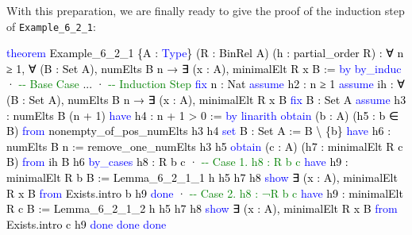 \documentclass[
  letterpaper,
  DIV=11,
  numbers=noendperiod]{scrreprt}
\newenvironment{Shaded}{\begin{snugshade}}{\end{snugshade}}
\newcommand{\CommentTok}[1]{\textcolor[rgb]{0.37,0.37,0.37}{#1}}
\newcommand{\KeywordTok}[1]{\textcolor[rgb]{0.00,0.23,0.31}{#1}}
\newcommand{\NormalTok}[1]{\textcolor[rgb]{0.00,0.23,0.31}{#1}}
\renewcommand{\NormalTok}[1]{\textcolor[HTML]{000000}{#1}}
\renewcommand{\KeywordTok}[1]{\textcolor[HTML]{0000FF}{#1}}
\renewcommand{\CommentTok}[1]{\textcolor[HTML]{008000}{#1}}
\theoremstyle{remark}
\begin{document}
With this preparation, we are finally ready to give the proof of the
induction step of \texttt{Example\_6\_2\_1}:

\begin{Shaded}
\begin{Highlighting}[]
\KeywordTok{theorem}\NormalTok{ Example\_6\_2\_1 \{A : }\KeywordTok{Type}\NormalTok{\} (R : BinRel A) (h : partial\_order R) :}
\NormalTok{    ∀ n ≥ 1, ∀ (B : Set A), numElts B n →}
\NormalTok{      ∃ (x : A), minimalElt R x B := }\KeywordTok{by}
  \KeywordTok{by\_induc}
\NormalTok{  · }\CommentTok{{-}{-} Base Case}
\NormalTok{    ...}
\NormalTok{  · }\CommentTok{{-}{-} Induction Step}
    \KeywordTok{fix}\NormalTok{ n : Nat}
    \KeywordTok{assume}\NormalTok{ h2 : n ≥ 1}
    \KeywordTok{assume}\NormalTok{ ih : ∀ (B : Set A), numElts B n → ∃ (x : A), minimalElt R x B}
    \KeywordTok{fix}\NormalTok{ B : Set A}
    \KeywordTok{assume}\NormalTok{ h3 : numElts B (n + 1)}
    \KeywordTok{have}\NormalTok{ h4 : n + 1 \textgreater{} 0 := }\KeywordTok{by} \KeywordTok{linarith}
    \KeywordTok{obtain}\NormalTok{ (b : A) (h5 : b ∈ B) }\KeywordTok{from}\NormalTok{ nonempty\_of\_pos\_numElts h3 h4}
    \KeywordTok{set}\NormalTok{ B\textquotesingle{} : Set A := B \textbackslash{} \{b\}}
    \KeywordTok{have}\NormalTok{ h6 : numElts B\textquotesingle{} n := remove\_one\_numElts h3 h5}
    \KeywordTok{obtain}\NormalTok{ (c : A) (h7 : minimalElt R c B\textquotesingle{}) }\KeywordTok{from}\NormalTok{ ih B\textquotesingle{} h6}
    \KeywordTok{by\_cases}\NormalTok{ h8 : R b c}
\NormalTok{    · }\CommentTok{{-}{-} Case 1. h8 : R b c}
      \KeywordTok{have}\NormalTok{ h9 : minimalElt R b B := Lemma\_6\_2\_1\_1 h h5 h7 h8}
      \KeywordTok{show}\NormalTok{ ∃ (x : A), minimalElt R x B }\KeywordTok{from}\NormalTok{ Exists.intro b h9}
      \KeywordTok{done}
\NormalTok{    · }\CommentTok{{-}{-} Case 2. h8 : ¬R b c}
      \KeywordTok{have}\NormalTok{ h9 : minimalElt R c B := Lemma\_6\_2\_1\_2 h h5 h7 h8}
      \KeywordTok{show}\NormalTok{ ∃ (x : A), minimalElt R x B }\KeywordTok{from}\NormalTok{ Exists.intro c h9}
      \KeywordTok{done}
    \KeywordTok{done}
  \KeywordTok{done}
\end{Highlighting}
\end{Shaded}
\end{document}
